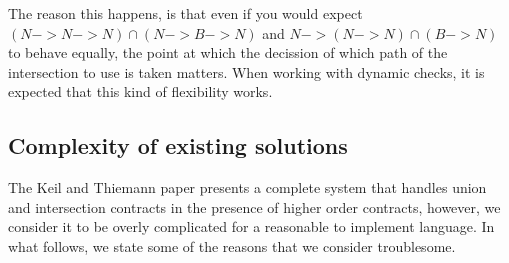 The reason this happens, is that even if you would expect
$(N -> N -> N) \cap (N -> B -> N)$
and $N -> (N -> N) \cap (B -> N)$ to behave equally, the point at which
the decission of which path of the intersection to use is taken
matters.
When working with dynamic checks, it is expected that this kind of
flexibility works.



\subsection{Complexity of existing solutions}

The Keil and Thiemann paper presents a complete system that handles union and intersection
contracts in the presence of higher order contracts, however, we consider it to be overly
complicated for a reasonable to implement language.
In what follows, we state some of the reasons that we consider troublesome.








